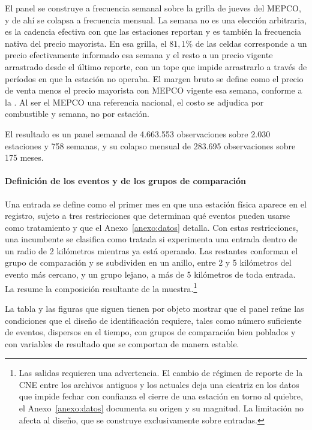 El panel se construye a frecuencia semanal sobre la grilla de jueves del MEPCO, y de ahí se colapsa a frecuencia mensual. La semana no es una elección arbitraria, es la cadencia efectiva con que las estaciones reportan y es también la frecuencia nativa del precio mayorista. En esa grilla, el $81{,}1\%$ de las celdas corresponde a un precio efectivamente informado esa semana y el resto a un precio vigente arrastrado desde el último reporte, con un tope que impide arrastrarlo a través de períodos en que la estación no operaba. El margen bruto se define como el precio de venta menos el precio mayorista con MEPCO vigente esa semana, conforme a la . Al ser el MEPCO una referencia nacional, el costo se adjudica por combustible y semana, no por estación.

El resultado es un panel semanal de 4.663.553 observaciones sobre 2.030 estaciones y 758 semanas, y su colapso mensual de 283.695 observaciones sobre 175 meses.

\paragraph{Definición de los eventos y de los grupos de comparación} Una entrada se define como el primer mes en que una estación física aparece en el registro, sujeto a tres restricciones que determinan qué eventos pueden usarse como tratamiento y que el Anexo~\ref{anexo:datos} detalla. Con estas restricciones, una incumbente se clasifica como tratada si experimenta una entrada dentro de un radio de 2 kilómetros mientras ya está operando. Las restantes conforman el grupo de comparación y se subdividen en un anillo, entre 2 y 5 kilómetros del evento más cercano, y un grupo lejano, a más de 5 kilómetros de toda entrada. La  resume la composición resultante de la muestra.\footnote{Las salidas requieren una advertencia. El cambio de régimen de reporte de la CNE entre los archivos antiguos y los actuales deja una cicatriz en los datos que impide fechar con confianza el cierre de una estación en torno al quiebre, el Anexo~\ref{anexo:datos} documenta su origen y su magnitud. La limitación no afecta al diseño, que se construye exclusivamente sobre entradas.}

\begin{table}[H]
\centering
\caption{Composición de la muestra}
\label{tab:resumen}
\end{table}

La tabla y las figuras que siguen tienen por objeto mostrar que el panel reúne las condiciones que el diseño de identificación requiere, tales como número suficiente de eventos, dispersos en el tiempo, con grupos de comparación bien poblados y con variables de resultado que se comportan de manera estable.

